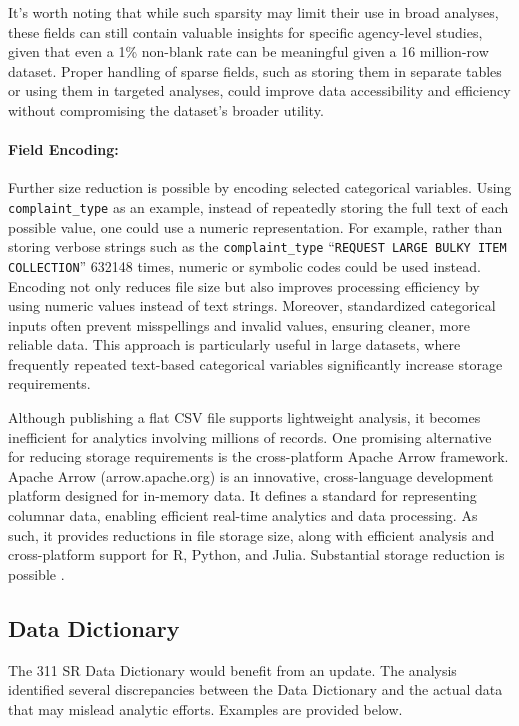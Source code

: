 \documentclass[linenumber]{jdsart}
\begin{document}
It's worth noting that while such sparsity may limit their use in 
broad analyses, these fields can still contain valuable insights 
for specific agency-level studies, given that even a 1\% 
non-blank rate can be meaningful given a \num{16} million-row 
dataset. Proper handling of sparse fields, 
such as storing them in separate tables or using them in 
targeted analyses, could improve data accessibility and 
efficiency without compromising the dataset’s broader utility.

\paragraph{Field Encoding:} Further size reduction is possible 
by encoding selected categorical variables. Using 
\texttt{complaint\_type} as an example,
instead of repeatedly storing the full text of each possible value,
one could use a numeric representation. For example, rather than
storing verbose strings such as the \texttt{complaint\_type} 
“\texttt{REQUEST LARGE BULKY ITEM COLLECTION}” \num{632148} times,
numeric or symbolic codes could be used instead. Encoding not only 
reduces file size but also improves processing efficiency by 
using numeric values instead of text strings. Moreover, standardized 
categorical inputs often prevent misspellings and invalid values, ensuring 
cleaner, more reliable data. This approach is particularly useful in 
large datasets, where frequently repeated text-based 
categorical variables significantly increase storage requirements.

Although publishing a flat CSV file supports lightweight 
analysis, it becomes inefficient for analytics 
involving millions of records. One promising alternative for reducing 
storage requirements is the cross-platform Apache Arrow framework. 
Apache Arrow (arrow.apache.org) is an innovative, cross-language 
development platform designed for in-memory data. 
It defines a standard for representing columnar data, 
enabling efficient real-time analytics and data processing. As such, 
it provides reductions in file storage size,
along with efficient analysis and cross-platform support for R,
Python, and Julia. Substantial storage reduction is 
possible \citep{bates2024csv}.

\subsection{Data Dictionary} 
\label{sec:datadictionary}


The 311 SR Data Dictionary would benefit from an update. The analysis 
identified several discrepancies between the Data Dictionary and 
the actual data that may mislead analytic efforts. Examples are provided below.
\end{document}
